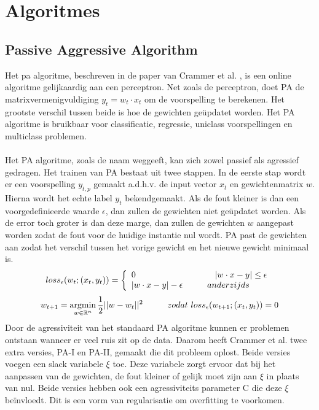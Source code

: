 \section{Algoritmes}
\subsection{Passive Aggressive Algorithm}
Het \gls{pa} algoritme, beschreven in de paper van Crammer et al. \cite{pa algorithm}, is een online algoritme gelijkaardig aan een perceptron. Net zoals de perceptron, doet PA de matrixvermenigvuldiging $y_t=w_t \cdot x_t$ om de voorspelling te berekenen. Het grootste verschil tussen beide is hoe de gewichten geüpdatet worden. Het PA algoritme is bruikbaar voor classificatie, regressie, uniclass voorspellingen en multiclass problemen.
\\\\
\noindent Het PA algoritme, zoals de naam weggeeft, kan zich zowel passief als agressief gedragen. Het trainen van PA bestaat uit twee stappen. In de eerste stap wordt er een voorspelling $y_{t,p}$ gemaakt a.d.h.v. de input vector $x_t$ en gewichtenmatrix $w$. Hierna wordt het echte label $y_t$ bekendgemaakt. Als de fout kleiner is dan een voorgedefinieerde waarde $\epsilon$, dan zullen de gewichten niet geüpdatet worden. Als de error toch groter is dan deze marge, dan zullen de gewichten $w$ aangepast worden zodat de fout voor de huidige instantie nul wordt. PA past de gewichten aan zodat het verschil tussen het vorige gewicht en het nieuwe gewicht minimaal is. 
\[
    loss_{\epsilon} (w_t;(x_t,y_t))=\left\{
                \begin{array}{ll}
                  0 \tab \tab \tab \ \ |w \cdot x - y| \leq \epsilon \\
                  |w \cdot x - y| - \epsilon \tab anderzijds
                \end{array}
              \right.\\
\]
\[
    w_{t+1}= \operatorname*{argmin}_{w \in \mathbb{R}^n}
     \frac{1}{2}||w-w_t||^2 \hspace*{1cm} zodat \ loss_{\epsilon} (w_{t+1};(x_t,y_t)) = 0
\]
Door de agressiviteit van het standaard PA algoritme kunnen er problemen ontstaan wanneer er veel ruis zit op de data. Daarom heeft Crammer et al. twee extra versies, PA-I en PA-II, gemaakt die dit probleem oplost. Beide versies voegen een slack variabele $\xi$ toe. Deze variabele zorgt ervoor dat bij het aanpassen van de gewichten, de fout kleiner of gelijk moet zijn aan $\xi$ in plaats van nul. Beide versies hebben ook een agressiviteits parameter C die deze $\xi$ beïnvloedt. Dit is een vorm van regularisatie om overfitting te voorkomen.

